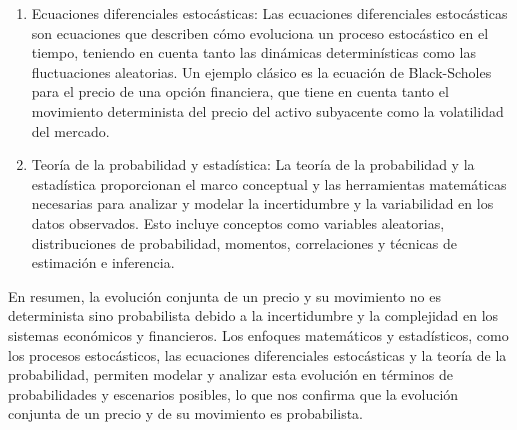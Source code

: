 \begin{problema}
\begin{sol}
\begin{enumerate}
    \item Ecuaciones diferenciales estocásticas: Las ecuaciones diferenciales estocásticas son ecuaciones que describen cómo evoluciona un proceso estocástico en el tiempo, teniendo en cuenta tanto las dinámicas determinísticas como las fluctuaciones aleatorias. Un ejemplo clásico es la ecuación de Black-Scholes para el precio de una opción financiera, que tiene en cuenta tanto el movimiento determinista del precio del activo subyacente como la volatilidad del mercado.
    
    \item Teoría de la probabilidad y estadística: La teoría de la probabilidad y la estadística proporcionan el marco conceptual y las herramientas matemáticas necesarias para analizar y modelar la incertidumbre y la variabilidad en los datos observados. Esto incluye conceptos como variables aleatorias, distribuciones de probabilidad, momentos, correlaciones y técnicas de estimación e inferencia.
\end{enumerate}



En resumen, la evolución conjunta de un precio y su movimiento no es determinista sino probabilista debido a la incertidumbre y la complejidad en los sistemas económicos y financieros. Los enfoques matemáticos y estadísticos, como los procesos estocásticos, las ecuaciones diferenciales estocásticas y la teoría de la probabilidad, permiten modelar y analizar esta evolución en términos de probabilidades y escenarios posibles, lo que nos confirma que la evolución conjunta de un precio y de su movimiento es probabilista. 
    \end{sol}
\end{problema}
%
%


